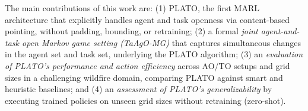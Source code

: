 

The main contributions of this work are: (1) PLATO, the first MARL architecture that explicitly handles agent and task openness via content-based pointing, without padding, bounding, or retraining; (2) a formal \emph{joint agent-and-task open Markov game setting (TaAgO-MG)} that captures simultaneous changes in the agent set and task set, underlying the PLATO algorithm; (3) an  \emph{evaluation of PLATO's performance and action efficiency} across AO/TO setups and grid sizes in a challenging wildfire domain, comparing PLATO against smart and heuristic baselines; and (4) an \emph{assessment of PLATO's generalizability} by executing trained policies on unseen grid sizes without retraining (zero-shot).

    



